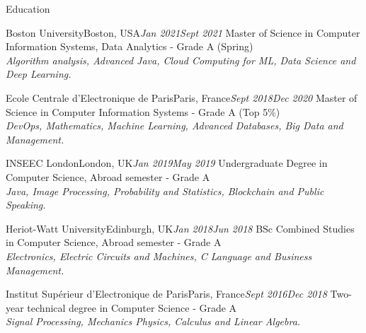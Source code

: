 \documentclass{resume}
\begin{document}
	\begin{rSection}{Education}
		\begin{school}{Boston University}{Boston, USA}{\em Jan 2021}{\em Sept 2021}{
			Master of Science in Computer Information Systems, Data Analytics - Grade A (Spring) \\
			\textit{\small{Algorithm analysis, Advanced Java, Cloud Computing for ML, Data Science and Deep Learning.}}
		}
		\end{school}
		\begin{school}{Ecole Centrale d'Electronique de Paris}{Paris, France}{\em Sept 2018}{\em Dec 2020}{
			Master of Science in Computer Information Systems - Grade A  (Top 5\%)\\
			\textit{\small{DevOps, Mathematics, Machine Learning, Advanced Databases, Big Data and Management.}}
		}
		\end{school}

		\begin{school}{INSEEC London}{London, UK}{\em Jan 2019}{\em May 2019}{
			Undergraduate Degree in Computer Science,  Abroad semester - Grade A \\
			\textit{\small{Java, Image Processing, Probability and Statistics, Blockchain and Public Speaking.}}
		}
		\end{school}

		\begin{school}{Heriot-Watt University}{Edinburgh, UK}{\em Jan 2018}{\em Jun 2018}{
			BSc Combined Studies in Computer Science,  Abroad semester - Grade A \\
			\textit{\small{Electronics, Electric Circuits and Machines, C Language and Business Management.}}
		}
		\end{school}
		
		\begin{school}{Institut Supérieur d'Electronique de Paris}{Paris, France}{\em Sept 2016}{\em Dec 2018}{
			Two-year technical degree in Computer Science - Grade A\\
			\textit{\small{Signal Processing, Mechanics Physics, Calculus and Linear Algebra.}}
		}
		\end{school}
	\end{rSection}
\end{document}
